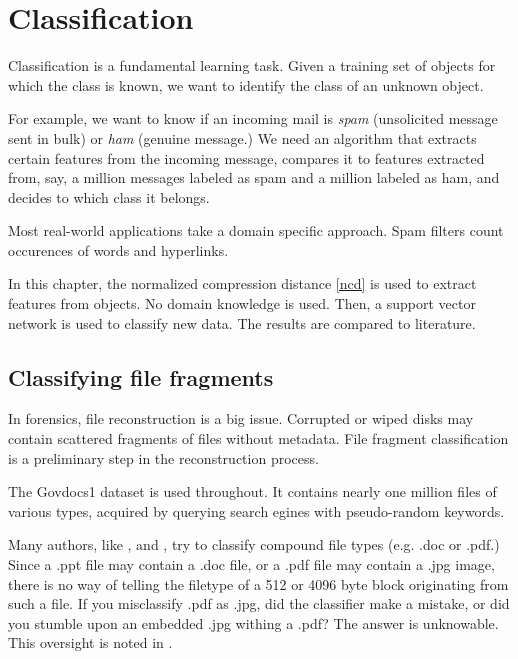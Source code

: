 
\chapter{Classification} %

\label{Chapter4} %



Classification is a fundamental learning task. Given a training
set of objects for which the class is known, we want to identify the class
of an unknown object.

For example, we want to know if an incoming mail is \emph{spam}
(unsolicited message sent in bulk) or \emph{ham} (genuine message.) We
need an algorithm that extracts certain features from the incoming
message, compares it to features extracted from, say, a million messages
labeled as spam and a million labeled as ham, and decides to which class
it belongs.

Most real-world applications take a domain specific approach. Spam filters
count occurences of words and hyperlinks.

In this chapter, the normalized compression distance \eqref{ncd} is used
to extract features from objects. No domain knowledge is used. Then,
a support vector network is used to classify new data. The results are
compared to literature.  

\section{Classifying file fragments}

In forensics, file reconstruction is a big issue. Corrupted or wiped disks
may contain scattered fragments of files without metadata. File fragment
classification is a preliminary step in the reconstruction process.

The Govdocs1 dataset \cite{Garfinkel2009} is used throughout. It contains
nearly one million files of various types, acquired by querying search
egines with pseudo-random keywords.

Many authors, like \cite{Li2010}, \cite{Veenman2007} and
\cite{Axelsson2010}, try to classify compound file types (e.g. .doc or
.pdf.) Since a .ppt file may contain a .doc file, or a .pdf file may
contain a .jpg image, there is no way of telling the filetype of a 512 or
4096 byte block originating from such a file. If you misclassify .pdf as
     .jpg, did the classifier make a mistake, or did you stumble upon an
     embedded .jpg withing a .pdf? The answer is unknowable. This
     oversight is noted in \cite{Roussev2013}.


